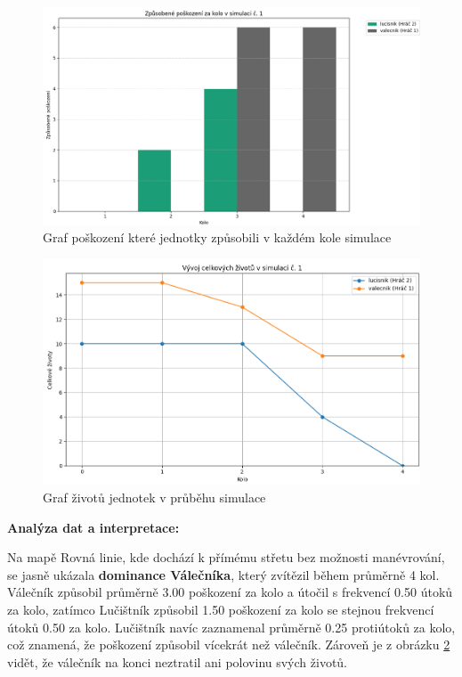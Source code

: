 \begin{figure}
  \centering      %
  \includegraphics[scale=0.5]{obr/graf_valVSluc_linie_damage.png} %
  \caption{Graf poškození které jednotky způsobili v každém kole simulace} %
  \label{graf_valVSluc_linie_damage} %
\end{figure}

\begin{figure}
  \centering      %
  \includegraphics[scale=0.5]{obr/graf_valVSluc_linie_HP.png} %
  \caption{Graf životů jednotek v průběhu simulace} %
  \label{graf_valVSluc_linie_HP} %
\end{figure}

\textbf{Analýza dat a interpretace:}

Na mapě Rovná linie, kde dochází k přímému střetu bez možnosti manévrování, se jasně ukázala \textbf{dominance Válečníka}, který zvítězil během průměrně 4 kol. Válečník způsobil průměrně 3.00 poškození za kolo a útočil s frekvencí 0.50 útoků za kolo, zatímco Lučištník způsobil 1.50 poškození za kolo se stejnou frekvencí útoků 0.50 za kolo. Lučištník navíc zaznamenal průměrně 0.25 protiútoků za kolo, což znamená, že poškození způsobil vícekrát než válečník. Zároveň je z obrázku \ref{graf_valVSluc_linie_HP} vidět, že válečník na konci neztratil ani polovinu svých životů.

